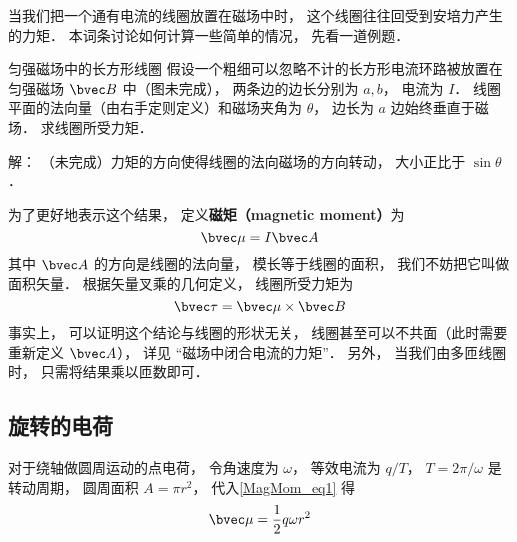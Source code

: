 
\begin{issues}
\issueTODO
\end{issues}


当我们把一个通有电流的线圈放置在磁场中时， 这个线圈往往回受到安培力产生的力矩． 本词条讨论如何计算一些简单的情况， 先看一道例题．

\begin{example}{匀强磁场中的长方形线圈}
假设一个粗细可以忽略不计的长方形电流环路被放置在匀强磁场 $\bvec B$ 中（图未完成）， 两条边的边长分别为 $a, b$， 电流为 $I$． 线圈平面的法向量（由右手定则定义）和磁场夹角为 $\theta$， 边长为 $a$ 边始终垂直于磁场． 求线圈所受力矩．

解： （未完成）力矩的方向使得线圈的法向磁场的方向转动， 大小正比于 $\sin\theta$．
\end{example}

为了更好地表示这个结果， 定义\textbf{磁矩（magnetic moment）}为
\begin{equation}\label{MagMom_eq1}
\bvec \mu = I \bvec A
\end{equation}
其中 $\bvec A$ 的方向是线圈的法向量， 模长等于线圈的面积， 我们不妨把它叫做面积矢量． 根据矢量叉乘的几何定义， 线圈所受力矩为
\begin{equation}
\bvec \tau = \bvec \mu \times \bvec B
\end{equation}
事实上， 可以证明这个结论与线圈的形状无关， 线圈甚至可以不共面（此时需要重新定义 $\bvec A$）， 详见 “磁场中闭合电流的力矩”． 另外， 当我们由多匝线圈时， 只需将结果乘以匝数即可．

\subsection{旋转的电荷}
对于绕轴做圆周运动的点电荷， 令角速度为 $\omega$， 等效电流为 $q/T$， $T = 2\pi/\omega$ 是转动周期， 圆周面积 $A = \pi r^2$， 代入\autoref{MagMom_eq1} 得
\begin{equation}
\bvec \mu = \frac{1}{2} q\omega r^2
\end{equation}

